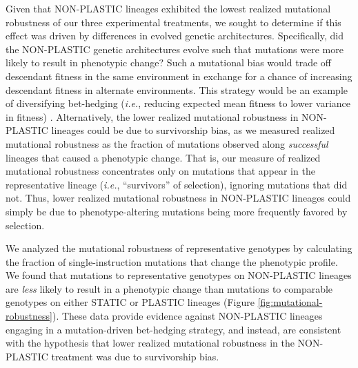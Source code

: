 \begin{raggedbottom}
Given that NON-PLASTIC lineages exhibited the lowest realized mutational robustness of our three experimental treatments, we sought to determine if this effect was driven by differences in evolved genetic architectures.
Specifically, did the NON-PLASTIC genetic architectures evolve such that mutations were more likely to result in phenotypic change?
Such a mutational bias would trade off descendant fitness in the same environment in exchange for a chance of increasing descendant fitness in alternate environments.
This strategy would be an example of diversifying bet-hedging (\textit{i.e.}, reducing expected mean fitness to lower variance in fitness) \citep{childs2010evolutionary}.
Alternatively, the lower realized mutational robustness in NON-PLASTIC lineages could be due to survivorship bias, as we measured realized mutational robustness as the fraction of mutations observed along \textit{successful} lineages that caused a phenotypic change.
That is, our measure of realized mutational robustness concentrates only on mutations that appear in the representative lineage (\textit{i.e.}, ``survivors'' of selection), ignoring mutations that did not. 
Thus, lower realized mutational robustness in NON-PLASTIC lineages could simply be due to phenotype-altering mutations being more frequently favored by selection.


We analyzed the mutational robustness of representative genotypes by calculating the fraction of single-instruction mutations that change the phenotypic profile.
We found that mutations to representative genotypes on NON-PLASTIC lineages are \textit{less} likely to result in a phenotypic change than mutations to comparable genotypes on either STATIC or PLASTIC lineages (Figure \ref{fig:mutational-robustness}).
These data provide evidence against NON-PLASTIC lineages engaging in a mutation-driven bet-hedging strategy, and instead, are consistent with the hypothesis that lower realized mutational robustness in the NON-PLASTIC treatment was due to survivorship bias.


\end{raggedbottom}
